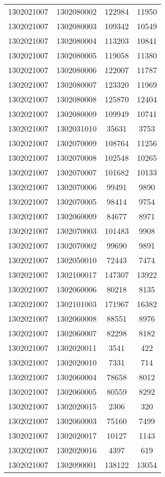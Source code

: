 \begin{longtable}{llcc}
1302021007 & 1302080002 & 122984 & 11950\\
1302021007 & 1302080003 & 109342 & 10549\\
1302021007 & 1302080004 & 113203 & 10841\\
1302021007 & 1302080005 & 119058 & 11380\\
1302021007 & 1302080006 & 122007 & 11787\\
1302021007 & 1302080007 & 123320 & 11969\\
1302021007 & 1302080008 & 125870 & 12404\\
1302021007 & 1302080009 & 109949 & 10741\\
1302021007 & 1302031010 & 35631 & 3753\\
1302021007 & 1302070009 & 108764 & 11256\\
1302021007 & 1302070008 & 102548 & 10265\\
1302021007 & 1302070007 & 101682 & 10133\\
1302021007 & 1302070006 & 99491 & 9890\\
1302021007 & 1302070005 & 98414 & 9754\\
1302021007 & 1302060009 & 84677 & 8971\\
1302021007 & 1302070003 & 101483 & 9908\\
1302021007 & 1302070002 & 99690 & 9891\\
1302021007 & 1302050010 & 72443 & 7474\\
1302021007 & 1302100017 & 147307 & 13922\\
1302021007 & 1302060006 & 80218 & 8135\\
1302021007 & 1302101003 & 171967 & 16382\\
1302021007 & 1302060008 & 88551 & 8976\\
1302021007 & 1302060007 & 82298 & 8182\\
1302021007 & 1302020011 & 3541 & 422\\
1302021007 & 1302020010 & 7331 & 714\\
1302021007 & 1302060004 & 78658 & 8012\\
1302021007 & 1302060005 & 80559 & 8292\\
1302021007 & 1302020015 & 2306 & 320\\
1302021007 & 1302060003 & 75160 & 7499\\
1302021007 & 1302020017 & 10127 & 1143\\
1302021007 & 1302020016 & 4397 & 619\\
1302021007 & 1302090001 & 138122 & 13054\\

\end{longtable}
